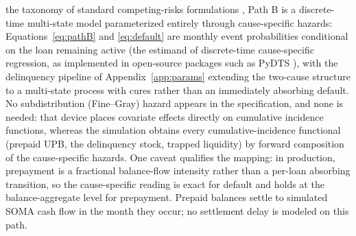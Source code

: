 \documentclass[12pt]{article}
\begin{document}
the taxonomy of standard competing-risks formulations \citep{putter2007}, Path B is a discrete-time multi-state model parameterized entirely through cause-specific hazards: Equations~\eqref{eq:pathB} and \eqref{eq:default} are monthly event probabilities conditional on the loan remaining active (the estimand of discrete-time cause-specific regression, as implemented in open-source packages such as PyDTS \citep{meir2025}), with the delinquency pipeline of Appendix~\ref{app:params} extending the two-cause structure to a multi-state process with cures rather than an immediately absorbing default. No subdistribution (Fine--Gray) hazard \citep{fine1999} appears in the specification, and none is needed: that device places covariate effects directly on cumulative incidence functions, whereas the simulation obtains every cumulative-incidence functional (prepaid UPB, the delinquency stock, trapped liquidity) by forward composition of the cause-specific hazards. One caveat qualifies the mapping: in production, prepayment is a fractional balance-flow intensity rather than a per-loan absorbing transition, so the cause-specific reading is exact for default and holds at the balance-aggregate level for prepayment. Prepaid balances settle to simulated SOMA cash flow in the month they occur; no settlement delay is modeled on this path.
\end{document}
